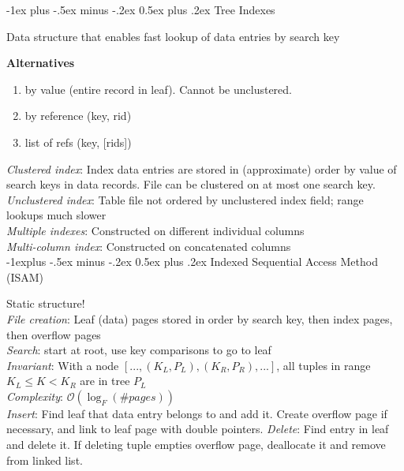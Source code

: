 \documentclass[10pt,landscape]{article}
\makeatletter
\renewcommand{\section}{\@startsection{section}{1}{0mm}%
                                {-1ex plus -.5ex minus -.2ex}%
                                {0.5ex plus .2ex}%
                                {\normalfont\large\bfseries}}
\renewcommand{\subsection}{\@startsection{subsection}{2}{0mm}%
                                {-1explus -.5ex minus -.2ex}%
                                {0.5ex plus .2ex}%
                                {\normalfont\normalsize\bfseries}}
\makeatother
\begin{document}
\begin{multicols}{3}

\section{Tree Indexes}

Data structure that enables fast lookup of data entries by search key

\textbf{Alternatives}

\begin{enumerate}
  \item by value (entire record in leaf). Cannot be unclustered.
  \item by reference (key, rid)
  \item list of refs (key, [rids])
\end{enumerate}

\textit{Clustered index}: Index data entries are stored in (approximate) order by value of search keys in data records. File can be clustered on at most one search key. \\
\textit{Unclustered index}: Table file not ordered by unclustered index field; range lookups much slower \\
\textit{Multiple indexes}: Constructed on different individual columns \\
\textit{Multi-column index}: Constructed on concatenated columns \\


\subsection{Indexed Sequential Access Method (ISAM)}

Static structure! \\
\textit{File creation}: Leaf (data) pages stored in order by search key, then index pages, then overflow pages \\
\textit{Search}: start at root, use key comparisons to go to leaf \\
\textit{Invariant}: With a node $[..., (K_L, P_L), (K_R, P_R), ...]$, all tuples in range $K_L \le K < K_R$ are in tree $P_L$ \\
\textit{Complexity}: $\mathcal{O}(\log_F(\# pages))$ \\
\textit{Insert}: Find leaf that data entry belongs to and add it. Create overflow page if necessary, and link to leaf page with double pointers.
\textit{Delete}: Find entry in leaf and delete it. If deleting tuple empties overflow page, deallocate it and remove from linked list.


\end{multicols}
\end{document}
